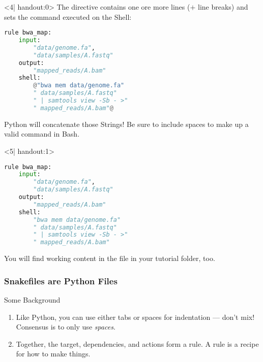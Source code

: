 \begin{frame}[fragile]
  \begin{onlyenv}<4| handout:0>
   The  directive contains one ore more lines ($+$ line breaks) and sets the command executed on the Shell:
  \begin{lstlisting}[language=Python,style=Python]
rule bwa_map:
    input:
        "data/genome.fa",
        "data/samples/A.fastq"
    output:
        "mapped_reads/A.bam"
    shell:
        @"bwa mem data/genome.fa"
        " data/samples/A.fastq"
        " | samtools view -Sb - >"
        " mapped_reads/A.bam"@
    \end{lstlisting}
    \bcattention Python will concatenate those Strings! Be sure to include spaces to make up a valid command in Bash.
  \end{onlyenv}
  \begin{onlyenv}<5| handout:1>
   \begin{lstlisting}[language=Python,style=Python]
rule bwa_map:
    input:
        "data/genome.fa",
        "data/samples/A.fastq"
    output:
        "mapped_reads/A.bam"
    shell:
        "bwa mem data/genome.fa"
        " data/samples/A.fastq"
        " | samtools view -Sb - >"
        " mapped_reads/A.bam"
    \end{lstlisting}
    You will find working content in the file  in your tutorial folder, too.
  \end{onlyenv}
\end{frame}

\begin{frame}
  \frametitle{Snakefiles are Python Files}
  \begin{block}{Some Background}
     \begin{enumerate}[<+->]
       \item Like Python, you can use either tabs or spaces for indentation — don’t mix! Consensus is to only use \emph{spaces}.
       \item Together, the target, dependencies, and actions form a rule. A rule is a recipe for how to make things.
  \end{enumerate}
  \end{block}
\end{frame}

